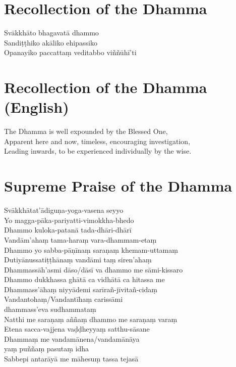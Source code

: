 \section*{Recollection of the Dhamma}

\begin{leader}
\end{leader}

Svākkhāto bhagavatā dhammo\\
Sandiṭṭhiko akāliko ehipassiko\\
Opanayiko paccattaṃ veditabbo viññūhī'ti

\clearpage

\section*{Recollection of the Dhamma (English)}

\begin{leader}
\end{leader}

The Dhamma is well expounded by the Blessed One,\\
Apparent here and now, timeless, encouraging investigation,\\
Leading inwards, to be experienced individually by the wise.

\section*{Supreme Praise of the Dhamma}

\begin{leader}
\end{leader}

Svākkhātat'ādiguṇa-yoga-vasena seyyo\\
Yo magga-pāka-pariyatti-vimokkha-bhedo\\
Dhammo kuloka-patanā tada-dhāri-dhārī\\
Vandām'ahaṃ tama-haraṃ vara-dhammam-etaṃ\\
Dhammo yo sabba-pāṇīnaṃ saraṇaṃ khemam-uttamaṃ\\
Dutiyānussatiṭṭhānaṃ vandāmi taṃ siren'ahaṃ\\
Dhammassāh'asmi dāso/dāsī va dhammo me sāmi-kissaro\\
Dhammo dukkhassa ghātā ca vidhātā ca hitassa me\\
Dhammass'āhaṃ niyyādemi sarīrañ-jīvitañ-cidaṃ\\
Vandantohaṃ/Vandantīhaṃ carissāmi\\
\vin dhammass'eva sudhammataṃ\\
Natthi me saraṇaṃ aññaṃ dhammo me saraṇaṃ varaṃ\\
Etena sacca-vajjena vaḍḍheyyaṃ satthu-sāsane\\
Dhammaṃ me vandamānena/vandamānāya\\
\vin yaṃ puññaṃ pasutaṃ idha\\
Sabbepi antarāyā me māhesuṃ tassa tejasā


